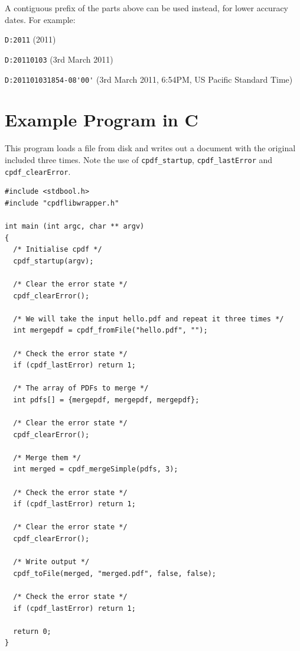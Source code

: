 \documentclass[a4paper]{memoir}
\begin{document}
\noindent A contiguous prefix of the parts above can be used instead, for lower
accuracy dates. For example:

\begin{framed}
   \small\noindent\verb!D:2011! (2011)
   
   \vspace{1.5mm}
   \noindent\verb!D:20110103! (3rd March 2011)

   \vspace{1.5mm}
   \noindent\verb!D:201101031854-08'00'! (3rd March 2011, 6:54PM, US Pacific Standard Time)
   
\end{framed}
\chapter{Example Program in C}
This program loads a file from disk and writes out a document with the original included three times. Note the use of \texttt{cpdf\_startup}, \texttt{cpdf\_lastError} and \texttt{cpdf\_clearError}.

\begin{small}
\begin{verbatim}
#include <stdbool.h>
#include "cpdflibwrapper.h"

int main (int argc, char ** argv)
{
  /* Initialise cpdf */
  cpdf_startup(argv);

  /* Clear the error state */
  cpdf_clearError();

  /* We will take the input hello.pdf and repeat it three times */
  int mergepdf = cpdf_fromFile("hello.pdf", "");

  /* Check the error state */
  if (cpdf_lastError) return 1;

  /* The array of PDFs to merge */
  int pdfs[] = {mergepdf, mergepdf, mergepdf};

  /* Clear the error state */
  cpdf_clearError();

  /* Merge them */
  int merged = cpdf_mergeSimple(pdfs, 3);
  
  /* Check the error state */
  if (cpdf_lastError) return 1;

  /* Clear the error state */
  cpdf_clearError();

  /* Write output */
  cpdf_toFile(merged, "merged.pdf", false, false);

  /* Check the error state */
  if (cpdf_lastError) return 1;

  return 0;
}
\end{verbatim}
\end{small}

\backmatter
\end{document}
